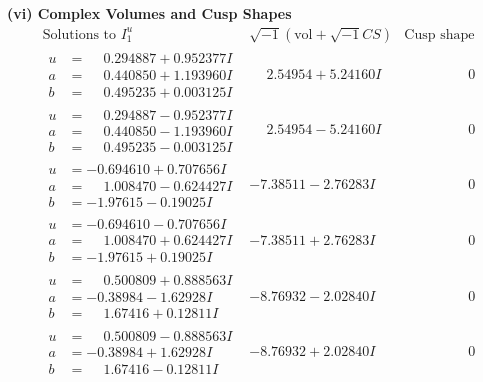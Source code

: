 \documentclass[1p]{elsarticle_modified}
\theoremstyle{definition}
\newcommand{\I}{\sqrt{-1}}
\begin{document}
\newpage\flushleft \textbf{(vi) Complex Volumes and Cusp Shapes}
$$\begin{array}{c|c|c}  
\text{Solutions to }I^u_{1}& \I (\text{vol} + \sqrt{-1}CS) & \text{Cusp shape}\\
 \hline 
\begin{aligned}
u &= \phantom{-}0.294887 + 0.952377 I \\
a &= \phantom{-}0.440850 + 1.193960 I \\
b &= \phantom{-}0.495235 + 0.003125 I\end{aligned}
 & \phantom{-}2.54954 + 5.24160 I & \phantom{-0.000000 } 0 \\ \hline\begin{aligned}
u &= \phantom{-}0.294887 - 0.952377 I \\
a &= \phantom{-}0.440850 - 1.193960 I \\
b &= \phantom{-}0.495235 - 0.003125 I\end{aligned}
 & \phantom{-}2.54954 - 5.24160 I & \phantom{-0.000000 } 0 \\ \hline\begin{aligned}
u &= -0.694610 + 0.707656 I \\
a &= \phantom{-}1.008470 - 0.624427 I \\
b &= -1.97615 - 0.19025 I\end{aligned}
 & -7.38511 - 2.76283 I & \phantom{-0.000000 } 0 \\ \hline\begin{aligned}
u &= -0.694610 - 0.707656 I \\
a &= \phantom{-}1.008470 + 0.624427 I \\
b &= -1.97615 + 0.19025 I\end{aligned}
 & -7.38511 + 2.76283 I & \phantom{-0.000000 } 0 \\ \hline\begin{aligned}
u &= \phantom{-}0.500809 + 0.888563 I \\
a &= -0.38984 - 1.62928 I \\
b &= \phantom{-}1.67416 + 0.12811 I\end{aligned}
 & -8.76932 - 2.02840 I & \phantom{-0.000000 } 0 \\ \hline\begin{aligned}
u &= \phantom{-}0.500809 - 0.888563 I \\
a &= -0.38984 + 1.62928 I \\
b &= \phantom{-}1.67416 - 0.12811 I\end{aligned}
 & -8.76932 + 2.02840 I & \phantom{-0.000000 } 0 \\ \hline\begin{aligned}

\end{aligned}
\end{array}$$
\end{document}
